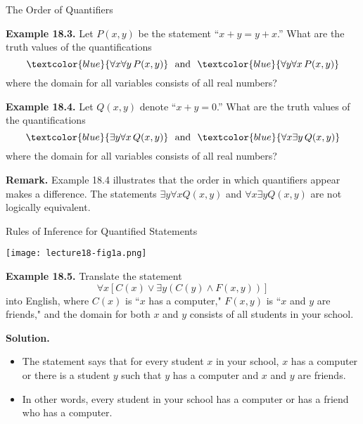 \documentclass[aspectratio=169]{beamer}
\providecommand{\Blue}[1]{\textcolor{blue}{#1}}
\begin{document}
\begin{frame}[plain]{The Order of Quantifiers}
 
 {\bf Example 18.3.} Let $P(x,y)$ be the statement ``$x+y = y+x$.'' What are the truth values of the quantifications
   \[ \Blue{\forall x\forall y\, P(x,y)}\ \ \mbox{and}\ \ \Blue{\forall y\forall x\, P(x,y)} \]
   where the domain for all variables consists of all real numbers? \pause
   
   \medskip
   
 {\bf Example 18.4.} Let $Q(x,y)$ denote ``$x+y=0$.'' What are the truth values of the quantifications
   \[ \Blue{\exists y\forall x\, Q(x,y)}\ \ \mbox{and}\ \ \Blue{\forall x\exists y\, Q(x,y)} \]
   where the domain for all variables consists of all real numbers? 
   \pause
   
   \vspace{.5in}
   
   {\bf Remark.} Example 18.4 illustrates that the order in which quantifiers appear makes a difference.
      The statements $\exists y\forall x Q(x,y)$ and $\forall x\exists y Q(x,y)$ are not logically equivalent.
   
   
\end{frame}


\begin{frame}[plain]{Rules of Inference for Quantified Statements}
   
   \begin{center}
     \texttt{[image: lecture18-fig1a.png]}
   \end{center}


\end{frame}

\begin{frame}[plain]{}

{\bf Example 18.5.} Translate the statement
\[ \forall x \left[ C(x)\vee \exists y \left( C(y)\wedge F(x,y)\right)\right] \]
into English, where $C(x)$ is ``$x$ has a computer,"
$F(x,y)$ is ``$x$ and $y$ are friends," and the domain
for both $x$ and $y$ consists of all students in your school.\pause
\medskip

{\bf Solution.} 
\begin{itemize}
 \item The statement says that for every student $x$ in your school, 
  $x$ has a computer or there
  is a student $y$ such that $y$ has a computer and $x$ and $y$ are friends. 
 \item In other words, every student
in your school has a computer or has a friend who has a computer. 
\end{itemize}

\end{frame}
\end{document}
